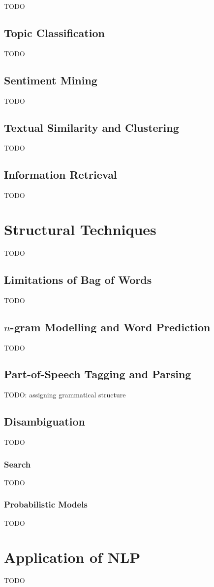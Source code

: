 \documentclass{article}
\begin{document}
TODO

\subsection{Topic Classification}

TODO

\subsection{Sentiment Mining}

TODO

\subsection{Textual Similarity and Clustering}

TODO

\subsection{Information Retrieval}

TODO

\section{Structural Techniques}

TODO

\subsection{Limitations of Bag of Words}

TODO

\subsection{$n$-gram Modelling and Word Prediction}

TODO

\subsection{Part-of-Speech Tagging and Parsing}

TODO: assigning grammatical structure

\subsection{Disambiguation}

TODO

\subsubsection{Search}

TODO

\subsubsection{Probabilistic Models}

TODO

\section{Application of NLP}

TODO
\end{document}

